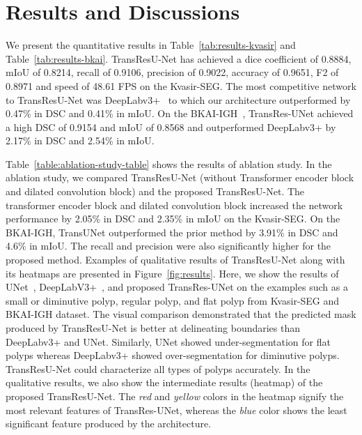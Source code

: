 \documentclass[conference]{IEEEtran}
\begin{document}
\section{Results and Discussions}
We present the quantitative results in Table~\ref{tab:results-kvasir} and Table~\ref{tab:results-bkai}.  TransResU-Net has achieved a dice coefficient of 0.8884, mIoU of  0.8214, recall of 0.9106, precision of 0.9022, accuracy of 0.9651, F2 of 0.8971 and speed of 48.61 FPS on the Kvasir-SEG. The most competitive network to TransResU-Net was DeepLabv3+~\cite{chen2018encoder} to which our architecture outperformed by 0.47\% in DSC and 0.41\% in mIoU. On the BKAI-IGH~\cite{lan2021neounet}, TransRes-UNet achieved a high DSC of 0.9154 and mIoU of 0.8568 and outperformed DeepLabv3+ by  2.17\% in DSC and 2.54\% in mIoU. 

Table~\ref{table:ablation-study-table} shows the results of ablation study. In the ablation study, we compared TransResU-Net (without Transformer encoder block and dilated convolution block) and the proposed TransResU-Net. The transformer encoder block and dilated convolution block increased the network performance by 2.05\% in DSC and 2.35\% in mIoU on the Kvasir-SEG. On the BKAI-IGH, TransUNet outperformed the prior method by 3.91\% in DSC and 4.6\% in mIoU. The recall and precision were also significantly higher for the proposed method.  Examples of qualitative results of TransResU-Net along with its heatmaps are presented in Figure~\ref{fig:results}. Here,  we show the results of UNet~\cite{ronneberger2015u}, DeepLabV3+~\cite{chen2018encoder}, and proposed TransRes-UNet on the examples such as a small or diminutive polyp, regular polyp, and flat polyp from Kvasir-SEG and BKAI-IGH dataset.  The visual comparison demonstrated that the predicted mask produced by TransResU-Net is better at delineating boundaries than DeepLabv3+ and UNet. Similarly, UNet showed under-segmentation for flat polyps whereas DeepLabv3+ showed over-segmentation for diminutive polyps. TransResU-Net could characterize all types of polyps accurately. In the qualitative results, we also show the intermediate results (heatmap) of the proposed TransResU-Net. The \textit{red} and \textit{yellow} colors in the heatmap signify the most relevant features of TransRes-UNet, whereas the \textit{blue} color shows the least significant feature produced by the architecture.  
\end{document}
